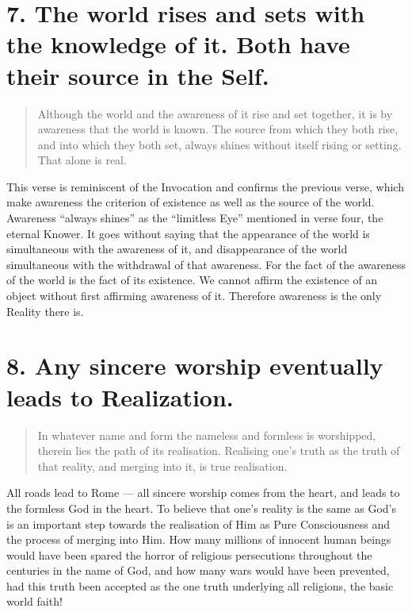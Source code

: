\documentclass[12pt]{report}
\begin{document}
\section{7. The world rises and sets with the knowledge of it. Both
  have their source in the Self.}

\begin{quote}
  Although the world and the awareness of it rise and set together, it
  is by awareness that the world is known. The source from which they
  both rise, and into which they both set, always shines without itself
  rising or setting. That alone is real.
\end{quote}


This verse is reminiscent of the Invocation and confirms the previous
verse, which make awareness the criterion of existence as well as the
source of the world. Awareness ``always shines'' as the ``limitless
Eye'' mentioned in verse four, the eternal Knower. It goes without
saying that the appearance of the world is simultaneous with the
awareness of it, and disappearance of the world simultaneous with the
withdrawal of that awareness. For the fact of the awareness of the
world is the fact of its existence. We cannot affirm the existence of
an object without first affirming awareness of it. Therefore awareness
is the only Reality there is.

\section{8. Any sincere worship eventually leads to Realization.}

\begin{quote}
  In whatever name and form the nameless and formless is worshipped,
  therein lies the path of its realisation. Realising one's truth as the
  truth of that reality, and merging into it, is true realisation.
\end{quote}


All roads lead to Rome --- all sincere worship comes from the heart,
and leads to the formless God in the heart. To believe that one's
reality is the same as God's is an important step towards the
realisation of Him as Pure Consciousness and the process of merging
into Him. How many millions of innocent human beings would have been
spared the horror of religious persecutions throughout the centuries
in the name of God, and how many wars would have been prevented, had
this truth been accepted as the one truth underlying all religions,
the basic world faith!
\end{document}
